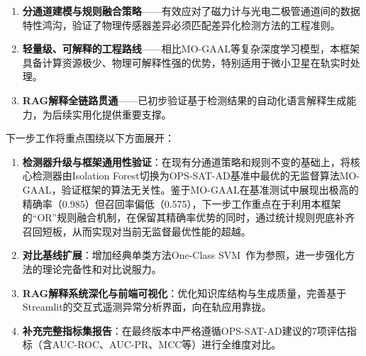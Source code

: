 \documentclass[conference]{IEEEtran}
\begin{document}
\begin{enumerate}
    \item \textbf{分通道建模与规则融合策略}——有效应对了磁力计与光电二极管通道间的数据特性鸿沟，验证了物理传感器差异必须匹配差异化检测方法的工程准则。
    \item \textbf{轻量级、可解释的工程路线}——相比MO-GAAL等复杂深度学习模型，本框架具备计算资源极少、物理可解释性强的优势，特别适用于微小卫星在轨实时处理。
    \item \textbf{RAG解释全链路贯通}——已初步验证基于检测结果的自动化语言解释生成能力，为后续实用化提供重要支撑。
\end{enumerate}

下一步工作将重点围绕以下方面展开：

\begin{enumerate}
    \item \textbf{检测器升级与框架通用性验证}：在现有分通道策略和规则不变的基础上，将核心检测器由Isolation Forest切换为OPS-SAT-AD基准中最优的无监督算法MO-GAAL，验证框架的算法无关性。鉴于MO-GAAL在基准测试中展现出极高的精确率（0.985）但召回率偏低（0.575），下一步工作重点在于利用本框架的``OR''规则融合机制，在保留其精确率优势的同时，通过统计规则兜底补齐召回短板，从而实现对当前无监督最优性能的超越。
    \item \textbf{对比基线扩展}：增加经典单类方法One-Class SVM~\cite{Scholkopf2001}作为参照，进一步强化方法的理论完备性和对比说服力。
    \item \textbf{RAG解释系统深化与前端可视化}：优化知识库结构与生成质量，完善基于Streamlit的交互式遥测异常分析界面，向在轨应用靠拢。
    \item \textbf{补充完整指标集报告}：在最终版本中严格遵循OPS-SAT-AD建议的7项评估指标（含AUC-ROC、AUC-PR、MCC等）进行全维度对比。
\end{enumerate}

\newpage


\end{document}
